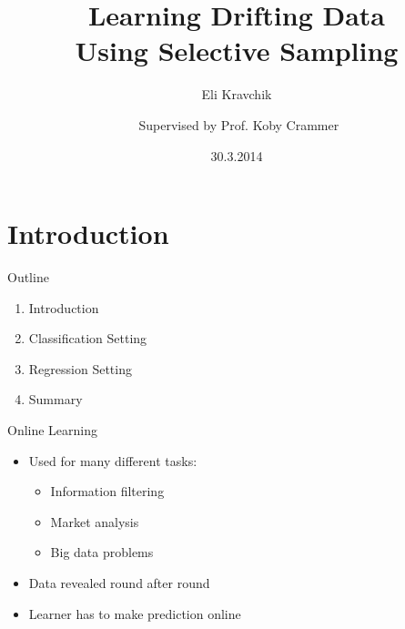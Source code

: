 \documentclass{beamer}
\title{Learning Drifting Data \\Using Selective Sampling}    %
\author {Eli Kravchik \and \newline\newline  $ $ Supervised by Prof. Koby Crammer\newline\newline
}
\institute{Faculty of Electrical Engineering, Technion\\
Israel Institute of Technology}
\date{30.3.2014}
\begin{document}
\maketitle
\section{Introduction}

\begin{frame}{Outline}
\begin{enumerate}
\item Introduction\newline
\item Classification Setting\newline
\item Regression Setting\newline
\item Summary
\end{enumerate}
\end{frame}


\begin{frame}{Online Learning}
\begin{itemize}
\item Used for many different tasks:\newline
\begin{itemize}
\item Information filtering\newline
\item Market analysis\newline
\item Big data problems\newline
\end{itemize}
\item Data revealed round after round\newline
\item Learner has to make prediction online
\end{itemize}
\end{frame}
\end{document}
